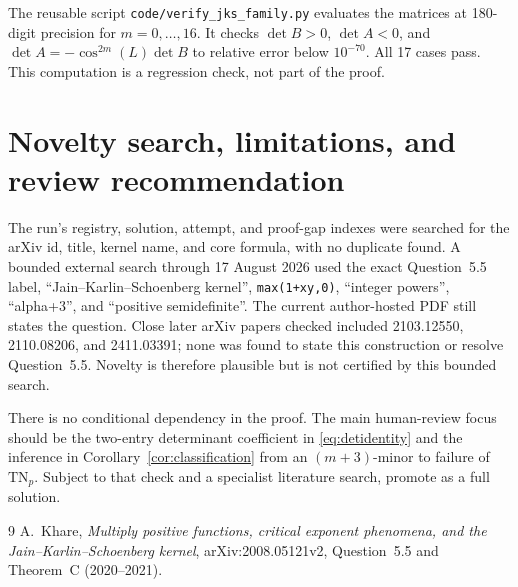 \documentclass[11pt]{article}
\newcommand{\TN}{\mathrm{TN}}
\begin{document}
The reusable script \texttt{code/verify\_jks\_family.py} evaluates the matrices
at 180-digit precision for $m=0,\ldots,16$.  It checks $\det B>0$, $\det A<0$,
and $\det A=-\cos^{2m}(L)\det B$ to relative error below $10^{-70}$.  All 17
cases pass.  This computation is a regression check, not part of the proof.

\section{Novelty search, limitations, and review recommendation}

The run's registry, solution, attempt, and proof-gap indexes were searched for
the arXiv id, title, kernel name, and core formula, with no duplicate found.
A bounded external search through 17 August 2026 used the exact Question~5.5
label, ``Jain--Karlin--Schoenberg kernel'', \texttt{max(1+xy,0)},
``integer powers'', ``alpha+3'', and ``positive semidefinite''.  The current
author-hosted PDF still states the question.  Close later arXiv papers checked
included 2103.12550, 2110.08206, and 2411.03391; none was found to state this
construction or resolve Question~5.5.  Novelty is therefore plausible but is
not certified by this bounded search.

There is no conditional dependency in the proof.  The main human-review focus
should be the two-entry determinant coefficient in
\eqref{eq:detidentity} and the inference in Corollary~\ref{cor:classification}
from an $(m+3)$-minor to failure of $\TN_p$.  Subject to that check and a
specialist literature search, promote as a full solution.

\begin{thebibliography}{9}
A.~Khare,
\emph{Multiply positive functions, critical exponent phenomena, and the
Jain--Karlin--Schoenberg kernel},
arXiv:2008.05121v2, Question~5.5 and Theorem~C (2020--2021).
\end{thebibliography}
\end{document}
